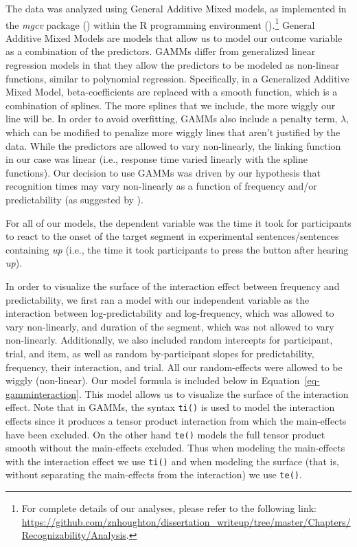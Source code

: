 \documentclass[
  12pt,
  letterpaper,
]{scrreport}
\begin{document}
The data was analyzed using General Additive Mixed models, as
implemented in the \emph{mgcv} package
() within the R programming
environment ().\footnote{For
  complete details of our analyses, please refer to the following link:
  \url{https://github.com/znhoughton/dissertation_writeup/tree/master/Chapters/Recognizability/Analysis}.}
General Additive Mixed Models are models that allow us to model our
outcome variable as a combination of the predictors. GAMMs differ from
generalized linear regression models in that they allow the predictors
to be modeled as non-linear functions, similar to polynomial regression.
Specifically, in a Generalized Additive Mixed Model, beta-coefficients
are replaced with a smooth function, which is a combination of splines.
The more splines that we include, the more wiggly our line will be. In
order to avoid overfitting, GAMMs also include a penalty term,
\(\lambda\), which can be modified to penalize more wiggly lines that
aren't justified by the data. While the predictors are allowed to vary
non-linearly, the linking function in our case was linear (i.e.,
response time varied linearly with the spline functions). Our decision
to use GAMMs was driven by our hypothesis that recognition times may
vary non-linearly as a function of frequency and/or predictability (as
suggested by
).

For all of our models, the dependent variable was the time it took for
participants to react to the onset of the target segment in experimental
sentences/sentences containing \emph{up} (i.e., the time it took
participants to press the button after hearing \emph{up}).

In order to visualize the surface of the interaction effect between
frequency and predictability, we first ran a model with our independent
variable as the interaction between log-predictability and
log-frequency, which was allowed to vary non-linearly, and duration of
the segment, which was not allowed to vary non-linearly. Additionally,
we also included random intercepts for participant, trial, and item, as
well as random by-participant slopes for predictability, frequency,
their interaction, and trial. All our random-effects were allowed to be
wiggly (non-linear). Our model formula is included below in
Equation~\ref{eq-gamminteraction}. This model allows us to visualize the
surface of the interaction effect. Note that in GAMMs, the syntax
\texttt{ti()} is used to model the interaction effects since it produces
a tensor product interaction from which the main-effects have been
excluded. On the other hand \texttt{te()} models the full tensor product
smooth without the main-effects excluded. Thus when modeling the
main-effects with the interaction effect we use \texttt{ti()} and when
modeling the surface (that is, without separating the main-effects from
the interaction) we use \texttt{te()}.
\end{document}
